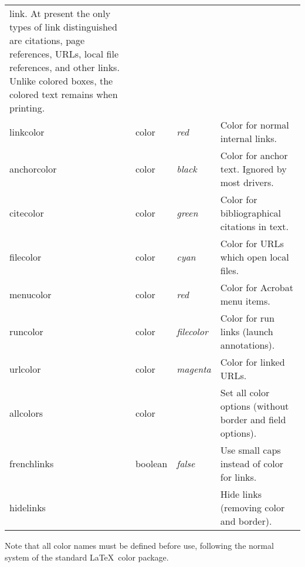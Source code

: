 \documentclass{article}
\newcommand*{\xpackage}[1]{\textsf{#1}}
\begin{document}
\begin{longtable}{@{}>{\ttfamily}ll>{\itshape}lp{8cm}@{}}
                                     link. At present the only types of link distinguished are citations, page references,
                                     URLs, local file references, and other links.
                                     Unlike colored boxes, the colored
                                     text remains when printing.\\
linkcolor      & color   & red     & Color for normal internal links. \\
anchorcolor    & color   & black   & Color for anchor text. Ignored by most drivers. \\
citecolor      & color   & green   & Color for bibliographical citations in text. \\
filecolor      & color   & cyan    & Color for URLs which open local files. \\
menucolor      & color   & red     & Color for Acrobat menu items. \\
runcolor       & color   & filecolor & Color for run links (launch annotations). \\
urlcolor       & color   & magenta & Color for linked URLs. \\
allcolors      & color   &         & Set all color options (without border and field options).\\
frenchlinks    & boolean & false   & Use small caps instead of color for links.\\
hidelinks      &         &         & Hide links (removing color and border). \\
\end{longtable} \smallskip

Note that all color names must be defined before use, following the
normal system of the standard \LaTeX\ \xpackage{color} package.
\end{document}
